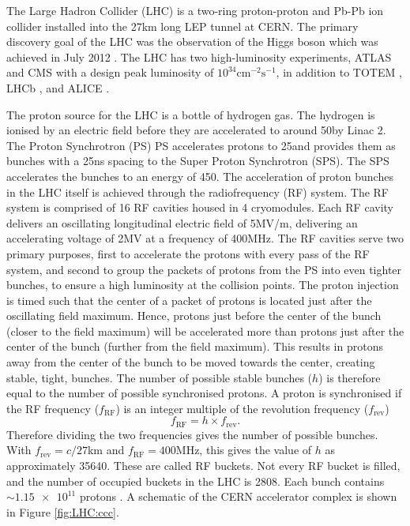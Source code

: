 The Large Hadron Collider \cite{LHC:LHC} (LHC) is a two-ring proton-proton and Pb-Pb ion collider installed into the 27km long LEP tunnel at CERN. The primary discovery goal of the LHC was the observation of the Higgs boson which was achieved in July 2012 \cite{Atlas:higgs}. The LHC has two high-luminosity experiments, ATLAS \cite{Atlas:design} and CMS \cite{LHC:CMS} with a design peak luminosity of $10^{34}\text{cm}^{-2}\text{s}^{-1}$, in addition to TOTEM \cite{LHC:TOTEM}, LHCb \cite{LHC:LHCb}, and ALICE \cite{LHC:ALICE}. 

The proton source for the LHC is a bottle of hydrogen gas. The hydrogen is ionised by an electric field before they are accelerated to around 50\MeV by Linac 2. The Proton Synchrotron (PS) PS accelerates protons to 25\GeV and provides them as bunches with a 25ns spacing to the Super Proton Synchrotron (SPS). The SPS accelerates the bunches to an energy of 450\GeV. The acceleration of proton bunches in the LHC itself is achieved through the radiofrequency (RF) system. The RF system is comprised of 16 RF cavities housed in 4 cryomodules. Each RF cavity delivers an oscillating longitudinal electric field of 5MV/m, delivering an accelerating voltage of 2MV at a frequency of 400MHz. The RF cavities serve two primary purposes, first to accelerate the protons with every pass of the RF system, and second to group the packets of  protons from the PS into even tighter bunches, to ensure a high luminosity at the collision points. The proton injection is timed such that the center of a packet of protons is located just after the oscillating field maximum. Hence, protons just before the center of the bunch (closer to the field maximum) will be accelerated more than protons just after the center of the bunch (further from the field maximum). This results in protons away from the center of the bunch to be moved towards the center, creating stable, tight, bunches. The number of possible stable bunches ($h$) is therefore equal to the number of possible synchronised protons. A proton is synchronised if the RF frequency ($f_{\text{RF}}$) is an integer multiple of the revolution frequency ($f_{\text{rev}}$)
\begin{equation}
    f_{\text{RF}}=h\times f_{\text{rev}}.
\end{equation}
Therefore dividing the two frequencies gives the number of possible bunches. With $f_{\text{rev}}=c/27$km and $f_{\text{RF}}=400$MHz, this gives the value of $h$ as approximately 35640. These are called RF buckets. Not every RF bucket is filled, and the number of occupied buckets in the LHC is 2808. Each bunch contains $\sim \num{1.15e11}$ protons \cite{LHC:design,LHC:acceleratorspedestrians,LHC:rfcavities}. A schematic of the CERN accelerator complex is shown in Figure \ref{fig:LHC:ccc}.
